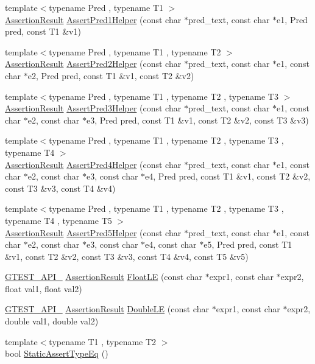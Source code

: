 \begin{DoxyCompactItemize}
{\footnotesize template$<$typename Pred , typename T1 $>$ }\\\hyperlink{classtesting_1_1AssertionResult}{Assertion\-Result} \hyperlink{namespacetesting_a7f73180474723be6e92185d6fa9e7c9f}{Assert\-Pred1\-Helper} (const char $\ast$pred\-\_\-text, const char $\ast$e1, Pred pred, const T1 \&v1)
\item 
{\footnotesize template$<$typename Pred , typename T1 , typename T2 $>$ }\\\hyperlink{classtesting_1_1AssertionResult}{Assertion\-Result} \hyperlink{namespacetesting_aa6587938029dd8733ecb885068f08247}{Assert\-Pred2\-Helper} (const char $\ast$pred\-\_\-text, const char $\ast$e1, const char $\ast$e2, Pred pred, const T1 \&v1, const T2 \&v2)
\item 
{\footnotesize template$<$typename Pred , typename T1 , typename T2 , typename T3 $>$ }\\\hyperlink{classtesting_1_1AssertionResult}{Assertion\-Result} \hyperlink{namespacetesting_ac92dcbd00a0ffb2913e65d286e321a22}{Assert\-Pred3\-Helper} (const char $\ast$pred\-\_\-text, const char $\ast$e1, const char $\ast$e2, const char $\ast$e3, Pred pred, const T1 \&v1, const T2 \&v2, const T3 \&v3)
\item 
{\footnotesize template$<$typename Pred , typename T1 , typename T2 , typename T3 , typename T4 $>$ }\\\hyperlink{classtesting_1_1AssertionResult}{Assertion\-Result} \hyperlink{namespacetesting_ae90c778d69db4682e8fd8baaa0a9f9cd}{Assert\-Pred4\-Helper} (const char $\ast$pred\-\_\-text, const char $\ast$e1, const char $\ast$e2, const char $\ast$e3, const char $\ast$e4, Pred pred, const T1 \&v1, const T2 \&v2, const T3 \&v3, const T4 \&v4)
\item 
{\footnotesize template$<$typename Pred , typename T1 , typename T2 , typename T3 , typename T4 , typename T5 $>$ }\\\hyperlink{classtesting_1_1AssertionResult}{Assertion\-Result} \hyperlink{namespacetesting_addcf52b273ce17269cbf4956cfe600a6}{Assert\-Pred5\-Helper} (const char $\ast$pred\-\_\-text, const char $\ast$e1, const char $\ast$e2, const char $\ast$e3, const char $\ast$e4, const char $\ast$e5, Pred pred, const T1 \&v1, const T2 \&v2, const T3 \&v3, const T4 \&v4, const T5 \&v5)
\item 
\hyperlink{ts__gtest_8h_aa73be6f0ba4a7456180a94904ce17790}{G\-T\-E\-S\-T\-\_\-\-A\-P\-I\-\_\-} \hyperlink{classtesting_1_1AssertionResult}{Assertion\-Result} \hyperlink{namespacetesting_a69106491c2e7f50e50da0ce5e8ae4374}{Float\-L\-E} (const char $\ast$expr1, const char $\ast$expr2, float val1, float val2)
\item 
\hyperlink{ts__gtest_8h_aa73be6f0ba4a7456180a94904ce17790}{G\-T\-E\-S\-T\-\_\-\-A\-P\-I\-\_\-} \hyperlink{classtesting_1_1AssertionResult}{Assertion\-Result} \hyperlink{namespacetesting_a84c020b981d0eb4eabfb0feda155aaaf}{Double\-L\-E} (const char $\ast$expr1, const char $\ast$expr2, double val1, double val2)
\item 
{\footnotesize template$<$typename T1 , typename T2 $>$ }\\bool \hyperlink{namespacetesting_a661e70fc6afeb5c085eed3716aa45059}{Static\-Assert\-Type\-Eq} ()
\end{DoxyCompactItemize}
